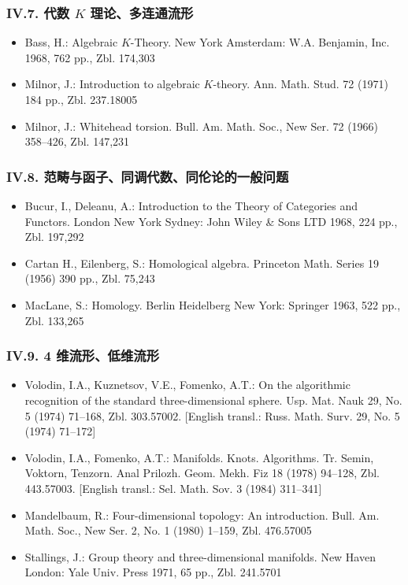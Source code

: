 \subsubsection*{IV.7. 代数 $K$ 理论、多连通流形}

\begin{itemize}
\item Bass, H.: Algebraic $K$-Theory. New York Amsterdam: W.A. Benjamin, Inc. 1968, 762 pp., Zbl. 174,303
\item Milnor, J.: Introduction to algebraic $K$-theory. Ann. Math. Stud. 72 (1971) 184 pp., Zbl. 237.18005
\item Milnor, J.: Whitehead torsion. Bull. Am. Math. Soc., New Ser. 72 (1966) 358--426, Zbl. 147,231
\end{itemize}

\subsubsection*{IV.8. 范畴与函子、同调代数、同伦论的一般问题}

\begin{itemize}
\item Bucur, I., Deleanu, A.: Introduction to the Theory of Categories and Functors. London New York Sydney: John Wiley \& Sons LTD 1968, 224 pp., Zbl. 197,292
\item Cartan H., Eilenberg, S.: Homological algebra. Princeton Math. Series 19 (1956) 390 pp., Zbl. 75,243
\item MacLane, S.: Homology. Berlin Heidelberg New York: Springer 1963, 522 pp., Zbl. 133,265
\end{itemize}

\subsubsection*{IV.9. 4 维流形、低维流形}

\begin{itemize}
\item Volodin, I.A., Kuznetsov, V.E., Fomenko, A.T.: On the algorithmic recognition of the standard three-dimensional sphere. Usp. Mat. Nauk 29, No. 5 (1974) 71--168, Zbl. 303.57002. [English transl.: Russ. Math. Surv. 29, No. 5 (1974) 71--172]
\item Volodin, I.A., Fomenko, A.T.: Manifolds. Knots. Algorithms. Tr. Semin, Voktorn, Tenzorn. Anal Prilozh. Geom. Mekh. Fiz 18 (1978) 94--128, Zbl. 443.57003. [English transl.: Sel. Math. Sov. 3 (1984) 311--341]
\item Mandelbaum, R.: Four-dimensional topology: An introduction. Bull. Am. Math. Soc., New Ser. 2, No. 1 (1980) 1--159, Zbl. 476.57005
\item Stallings, J.: Group theory and three-dimensional manifolds. New Haven London: Yale Univ. Press 1971, 65 pp., Zbl. 241.5701
\end{itemize}

